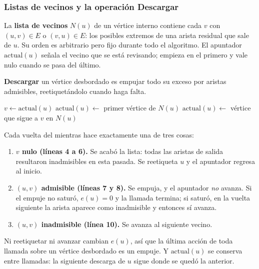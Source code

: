 \documentclass[11pt,letterpaper]{article}
\begin{document}
\subsubsection*{Listas de vecinos y la operación Descargar}

La \textbf{lista de vecinos} $N(u)$ de un vértice interno contiene
cada $v$ con $(u, v) \in E$ o $(v, u) \in E$: los posibles extremos de
una arista residual que sale de $u$. Su orden es arbitrario pero fijo
durante todo el algoritmo. El apuntador $\text{actual}(u)$ señala el
vecino que se está revisando; empieza en el primero y vale nulo cuando
se pasa del último.

\textbf{Descargar} un vértice desbordado es empujar todo su exceso
por aristas admisibles, reetiquetándolo cuando haga falta.

\begin{algorithm}[H]
\caption{\textsc{Descargar}$(u)$ \ (\textsc{Discharge} en Cormen)}
\label{alg:descargar}
\begin{algorithmic}[1]
    \State $v \gets \text{actual}(u)$
     
      \State {}
      \State $\text{actual}(u) \gets$ primer vértice de $N(u)$
      \State {} 
    \Else
      \State $\text{actual}(u) \gets$ vértice que sigue a $v$ en $N(u)$
    \EndIf
  \EndWhile
\EndProcedure
\end{algorithmic}
\end{algorithm}

Cada vuelta del mientras hace exactamente una de tres cosas:
\begin{enumerate}
  \item \textbf{$v$ nulo (líneas 4 a 6).} Se acabó la lista: todas las
        aristas de salida resultaron inadmisibles en esta pasada. Se
        reetiqueta $u$ y el apuntador regresa al inicio.
  \item \textbf{$(u, v)$ admisible (líneas 7 y 8).} Se empuja, y el
        apuntador \emph{no} avanza. Si el empuje no saturó, $e(u) = 0$
        y la llamada termina; si saturó, en la vuelta siguiente la
        arista aparece como inadmisible y entonces sí avanza.
  \item \textbf{$(u, v)$ inadmisible (línea 10).} Se avanza al
        siguiente vecino.
\end{enumerate}
Ni reetiquetar ni avanzar cambian $e(u)$, así que la última acción de
toda llamada sobre un vértice desbordado es un empuje. Y
$\text{actual}(u)$ se conserva entre llamadas: la siguiente descarga
de $u$ sigue donde se quedó la anterior.
\end{document}
